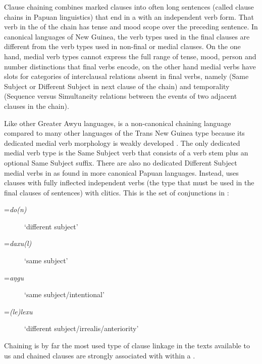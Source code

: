 \documentclass[output=paper]{LSP/langsci}
\begin{document}
Clause chaining combines  marked clauses into often long sentences (called clause chains in Papuan linguistics) that end in a  with an independent verb form. That verb in the  of the chain has tense and mood scope over the preceding sentence. In canonical  languages of New Guinea, the verb types used in the final clauses are different from the verb types used in non-final or medial clauses. On the one hand, medial verb types  cannot express the full range of tense, mood, person and number distinctions that final verbs encode, on the other hand medial verbs have slots for categories of interclausal relations absent in final verbs, namely  (Same Subject or Different Subject in next clause of the chain) and temporality (Sequence versus Simultaneity relations between the events of two adjacent clauses in the chain).

Like other Greater Awyu languages,  is a non-canonical chaining language compared to many other languages of the Trans New Guinea type because its dedicated medial verb morphology is weakly developed \citep{devries.2010}. The only dedicated medial verb type is the Same Subject verb that consists of a verb stem plus an optional Same Subject suffix. There are also no dedicated Different Subject medial verbs in  as found in more canonical Papuan  languages. Instead,  uses clauses with fully inflected independent verbs (the type that must be used in the final clauses of sentences) with  clitics. This is the set of  conjunctions in   \citep[][109]{enk97}: 

\begin{description}
\item[=\textit{do(n)}] 		`different subject'
 		\item[=\textit{daxu(l)}] 	`same subject'
     	\item[=\textit{aŋgu}]			`same subject/intentional'
     	\item[=\textit{(le)lexu}]	`different subject/irrealis/anteriority'
\end{description}
		
\noindent
Chaining is by far the most used type of clause linkage in the  texts available to us and chained clauses are strongly associated with  within a . 
\end{document}
